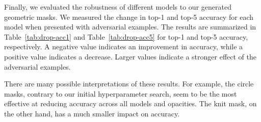\documentclass[a4paper, oneside]{discothesis}
\begin{document}
Finally, we evaluated the robustness of different models to our generated geometric masks. We measured the change in top-1 and top-5 accuracy for each model when presented with adversarial examples. The results are summarized in Table~\ref{tab:drop-acc1} and Table~\ref{tab:drop-acc5} for top-1 and top-5 accuracy, respectively. A negative value indicates an improvement in accuracy, while a positive value indicates a decrease. Larger values indicate a stronger effect of the adversarial examples.

There are many possible interpretations of these results. For example, the circle masks, contrary to our initial hyperparameter search, seem to be the most effective at reducing accuracy across all models and opacities. The knit mask, on the other hand, has a much smaller impact on accuracy.
\end{document}
